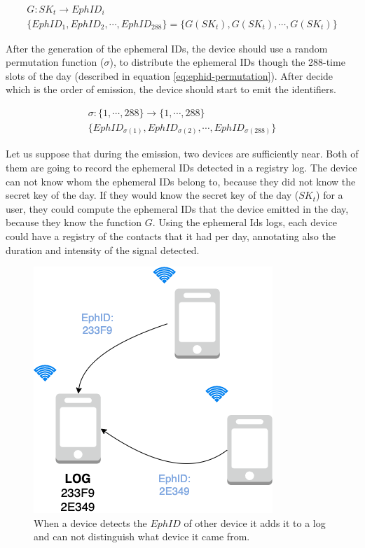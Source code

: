 \documentclass[a4paper, 12pt]{article}
\begin{document}
\begin{equation}
\begin{split}
    G: SK_t \rightarrow EphID_i \\
    \{EphID_1, EphID_2, \cdots, EphID_{288}\} = \{G(SK_t), G(SK_t), \cdots, G(SK_t)\}
\end{split}
\label{eq:ephemeral-id}
\end{equation}

After the generation of the ephemeral IDs, the device should use a random permutation function ($\sigma$), to distribute the ephemeral IDs though the 288-time slots of the day (described in equation \ref{eq:ephid-permutation}). After decide which is the order of emission, the device should start to emit the identifiers.

\begin{equation}
    \begin{split}
        \sigma : \{1, \cdots, 288\} \rightarrow \{1, \cdots, 288\} \\
        \{EphID_{\sigma(1)}, EphID_{\sigma(2)}, \cdots, EphID_{\sigma(288)}\}
    \end{split}
    \label{eq:ephid-permutation}
\end{equation}

Let us suppose that during the emission, two devices are sufficiently near. Both of them are going to record the ephemeral IDs detected in a registry log. The device can not know whom the ephemeral IDs belong to, because they did not know the secret key of the day. If they would know the secret key of the day ($SK_t$) for a user, they could compute the ephemeral IDs that the device emitted in the day, because they know the function $G$. Using the ephemeral Ids logs, each device could have a registry of the contacts that it had per day, annotating also the duration and intensity of the signal detected. \\

\begin{figure}[h]
    \centering
    \includegraphics[scale=0.4]{images/discussion/ephid-log.png}
    \caption{When a device detects the $EphID$ of other device it adds it to a log and can not distinguish what device it came from.}
    \label{fig:ephid-log}
\end{figure}
\end{document}

